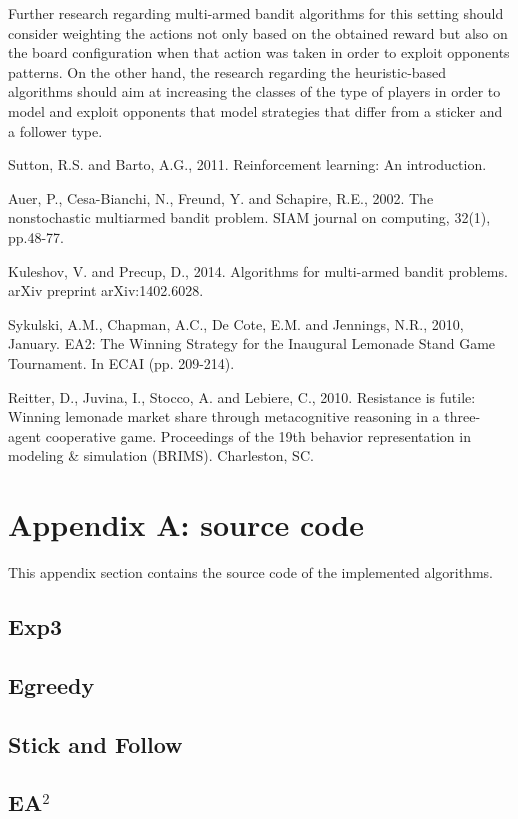 \documentclass[runningheads]{llncs}
\begin{document}
Further research regarding multi-armed bandit algorithms for this
setting should consider weighting the actions not only based on the
obtained reward but also on the board configuration when that action
was taken in order to exploit opponents patterns. On the other hand,
the research regarding the heuristic-based algorithms should aim at
increasing the classes of the type of players in order to model and
exploit opponents that model strategies that differ from a sticker and
a follower type.


\begin{thebibliography}{8}

Sutton, R.S. and Barto, A.G., 2011. Reinforcement learning: An
introduction.

Auer, P., Cesa-Bianchi, N., Freund, Y. and Schapire, R.E., 2002. The
nonstochastic multiarmed bandit problem. SIAM journal on computing,
32(1), pp.48-77.

Kuleshov, V. and Precup, D., 2014. Algorithms for multi-armed bandit
problems. arXiv preprint arXiv:1402.6028.

Sykulski, A.M., Chapman, A.C., De Cote, E.M. and Jennings, N.R., 2010,
January. EA2: The Winning Strategy for the Inaugural Lemonade Stand
Game Tournament. In ECAI (pp. 209-214).

Reitter, D., Juvina, I., Stocco, A. and Lebiere, C., 2010. Resistance
is futile: Winning lemonade market share through metacognitive
reasoning in a three-agent cooperative game. Proceedings of the 19th
behavior representation in modeling \& simulation (BRIMS). Charleston,
SC.
  
\end{thebibliography}

\section{Appendix A: source code}\label{appendix}
This appendix section contains the source code of the implemented algorithms.

\subsection{Exp3}


\subsection{Egreedy}


\subsection{Stick and Follow}


\subsection{EA$^2$}


\end{document}
